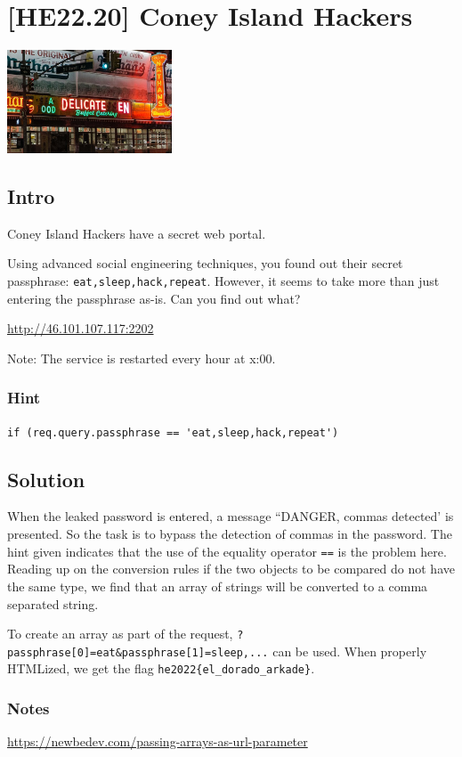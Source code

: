 
\hypertarget{he22.20}{%
\chapter{[HE22.20] Coney Island Hackers}\label{he22.20}}

\begin{marginfigure}
	\includegraphics[width=49mm]{level5/challenge20.jpg}
\end{marginfigure}
\section{Intro}
Coney Island Hackers have a secret web portal.

Using advanced social engineering techniques, you found out their secret passphrase: \verb+eat,sleep,hack,repeat+. However, it seems to take more than just entering the passphrase as-is. Can you find out what?

\noindent \url{http://46.101.107.117:2202}

\noindent Note: The service is restarted every hour at x:00.
\subsection{Hint}

\verb+if (req.query.passphrase == 'eat,sleep,hack,repeat')+

\section{Solution}\label{hv22.20solution}

When the leaked password is entered, a message ``DANGER, commas detected' is presented.  So the task is to bypass the detection of commas in the password.  The hint given indicates that the use of the equality operator \verb+==+ is the problem here.  Reading up on the conversion rules if the two objects to be compared do not have the same type, we find that an array of strings will be converted to a comma separated string.

To create an array as part of the request, \verb+?passphrase[0]=eat&passphrase[1]=sleep,...+ can be used.  When properly HTMLized, we get the flag \verb+he2022{el_dorado_arkade}+.
	
\subsection{Notes}
\url{https://newbedev.com/passing-arrays-as-url-parameter}








